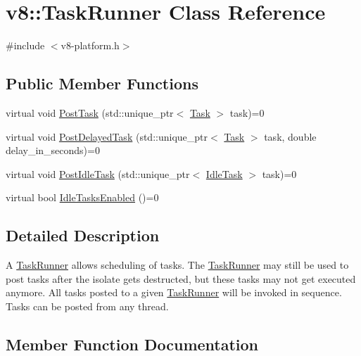 \hypertarget{classv8_1_1TaskRunner}{}\section{v8\+:\+:Task\+Runner Class Reference}
\label{classv8_1_1TaskRunner}


{\ttfamily \#include $<$v8-\/platform.\+h$>$}

\subsection*{Public Member Functions}
\begin{DoxyCompactItemize}
\item 
virtual void \mbox{\hyperlink{classv8_1_1TaskRunner_a755795cc77383daf067a17673569c685}{Post\+Task}} (std\+::unique\+\_\+ptr$<$ \mbox{\hyperlink{classv8_1_1Task}{Task}} $>$ task)=0
\item 
virtual void \mbox{\hyperlink{classv8_1_1TaskRunner_a8ae45842086210292d966e2e326629a4}{Post\+Delayed\+Task}} (std\+::unique\+\_\+ptr$<$ \mbox{\hyperlink{classv8_1_1Task}{Task}} $>$ task, double delay\+\_\+in\+\_\+seconds)=0
\item 
virtual void \mbox{\hyperlink{classv8_1_1TaskRunner_a0ebfb362d1cb3fa621f0f50b9ff0fb6f}{Post\+Idle\+Task}} (std\+::unique\+\_\+ptr$<$ \mbox{\hyperlink{classv8_1_1IdleTask}{Idle\+Task}} $>$ task)=0
\item 
virtual bool \mbox{\hyperlink{classv8_1_1TaskRunner_aa8a6077bed5735e2190918685faf20f5}{Idle\+Tasks\+Enabled}} ()=0
\end{DoxyCompactItemize}


\subsection{Detailed Description}
A \mbox{\hyperlink{classv8_1_1TaskRunner}{Task\+Runner}} allows scheduling of tasks. The \mbox{\hyperlink{classv8_1_1TaskRunner}{Task\+Runner}} may still be used to post tasks after the isolate gets destructed, but these tasks may not get executed anymore. All tasks posted to a given \mbox{\hyperlink{classv8_1_1TaskRunner}{Task\+Runner}} will be invoked in sequence. Tasks can be posted from any thread. 

\subsection{Member Function Documentation}
\mbox{\label{classv8_1_1TaskRunner_aa8a6077bed5735e2190918685faf20f5}} 
